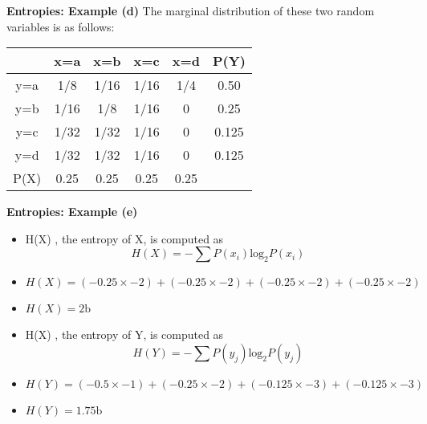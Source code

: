 \medskip
\noindent \textbf{Entropies: Example (d)}
The marginal distribution of these two random variables is as follows:\\ \bigskip
\begin{center}
\begin{tabular}{|c|c|c|c|c||c|}
\hline
&x=a& x=b & x=c & x=d &\alert{P(Y)}\\ \hline
y=a &1/8 &1/16 &1/16 &1/4 & \alert{0.50}\\ \hline
y=b &1/16 & 1/8& 1/16& 0 & \alert{0.25}\\ \hline
y=c & 1/32&1/32 & 1/16 & 0& \alert{0.125}\\ \hline
y=d & 1/32& 1/32& 1/16 & 0& \alert{0.125}\\ \hline \hline
\alert{P(X)} & \alert{0.25}& \alert{0.25}& \alert{0.25} & \alert{0.25}&\\ \hline
\end{tabular}
\end{center}



\medskip
\noindent \textbf{Entropies: Example (e)}
\begin{itemize}

\item H(X) , the entropy of X, is computed as\\
 \[H(X) = -\sum P(x_i) \mbox{log}_2P(x_i)\] \item $H(X) =  (-0.25 \times -2) + (-0.25 \times -2) +(-0.25 \times -2) +(-0.25 \times -2)$\item $ H(X) = 2 \mbox{b}$ \bigskip

\item H(X) , the entropy of Y, is computed as\\
 \[H(Y) = -\sum P(y_j) \mbox{log}_2P(y_j)\] \item $H(Y) =  (-0.5 \times -1) +(-0.25 \times -2)  + (-0.125 \times -3)  +(-0.125 \times -3)$\item $ H(Y) = 1.75 \mbox{b}$



\end{itemize}


